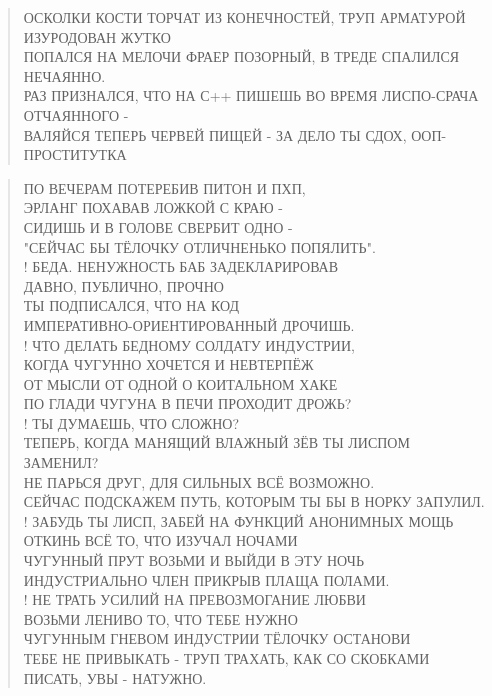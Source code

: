 \poemtitle{***}
\begin{verse}
ОСКОЛКИ КОСТИ ТОРЧАТ ИЗ КОНЕЧНОСТЕЙ, ТРУП АРМАТУРОЙ ИЗУРОДОВАН ЖУТКО\\
ПОПАЛСЯ НА МЕЛОЧИ ФРАЕР ПОЗОРНЫЙ, В ТРЕДЕ СПАЛИЛСЯ НЕЧАЯННО.\\
РАЗ ПРИЗНАЛСЯ, ЧТО НА С++ ПИШЕШЬ ВО ВРЕМЯ ЛИСПО-СРАЧА ОТЧАЯННОГО -\\
ВАЛЯЙСЯ ТЕПЕРЬ ЧЕРВЕЙ ПИЩЕЙ - ЗА ДЕЛО ТЫ СДОХ, ООП-ПРОСТИТУТКА
\end{verse}

\poemtitle{***}
\begin{verse}
ПО ВЕЧЕРАМ ПОТЕРЕБИВ ПИТОН И ПХП, \\
ЭРЛАНГ ПОХАВАВ ЛОЖКОЙ С КРАЮ -\\
СИДИШЬ И В ГОЛОВЕ СВЕРБИТ ОДНО - \\
"СЕЙЧАС БЫ ТЁЛОЧКУ ОТЛИЧНЕНЬКО ПОПЯЛИТЬ".\\!
БЕДА. НЕНУЖНОСТЬ БАБ ЗАДЕКЛАРИРОВАВ \\
ДАВНО, ПУБЛИЧНО, ПРОЧНО \\
ТЫ ПОДПИСАЛСЯ, ЧТО НА КОД \\
ИМПЕРАТИВНО-ОРИЕНТИРОВАННЫЙ ДРОЧИШЬ.\\!
ЧТО ДЕЛАТЬ БЕДНОМУ СОЛДАТУ ИНДУСТРИИ, \\
КОГДА ЧУГУННО ХОЧЕТСЯ И НЕВТЕРПЁЖ\\
ОТ МЫСЛИ ОТ ОДНОЙ О КОИТАЛЬНОМ ХАКЕ \\
ПО ГЛАДИ ЧУГУНА В ПЕЧИ ПРОХОДИТ ДРОЖЬ?\\!
ТЫ ДУМАЕШЬ, ЧТО СЛОЖНО? \\
ТЕПЕРЬ, КОГДА МАНЯЩИЙ ВЛАЖНЫЙ ЗЁВ ТЫ ЛИСПОМ ЗАМЕНИЛ?\\
НЕ ПАРЬСЯ ДРУГ, ДЛЯ СИЛЬНЫХ ВСЁ ВОЗМОЖНО. \\
СЕЙЧАС ПОДСКАЖЕМ ПУТЬ, КОТОРЫМ ТЫ БЫ В НОРКУ ЗАПУЛИЛ.\\!
ЗАБУДЬ ТЫ ЛИСП, ЗАБЕЙ НА ФУНКЦИЙ АНОНИМНЫХ МОЩЬ\\
ОТКИНЬ ВСЁ ТО, ЧТО ИЗУЧАЛ НОЧАМИ\\
ЧУГУННЫЙ ПРУТ ВОЗЬМИ И ВЫЙДИ В ЭТУ НОЧЬ\\
ИНДУСТРИАЛЬНО ЧЛЕН ПРИКРЫВ ПЛАЩА ПОЛАМИ.\\!
НЕ ТРАТЬ УСИЛИЙ НА ПРЕВОЗМОГАНИЕ ЛЮБВИ\\
ВОЗЬМИ ЛЕНИВО ТО, ЧТО ТЕБЕ НУЖНО\\
ЧУГУННЫМ ГНЕВОМ ИНДУСТРИИ ТЁЛОЧКУ ОСТАНОВИ\\
ТЕБЕ НЕ ПРИВЫКАТЬ - ТРУП ТРАХАТЬ, КАК СО СКОБКАМИ ПИСАТЬ, УВЫ - НАТУЖНО.
\end{verse}

